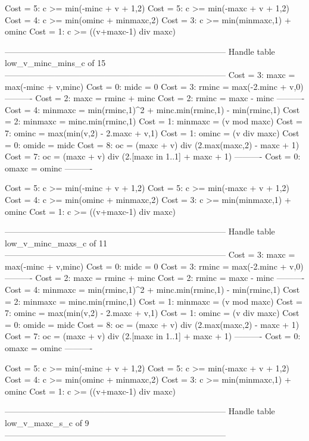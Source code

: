 Cost =  5:  c >= min(-minc + v + 1,2)
Cost =  5:  c >= min(-maxc + v + 1,2)
Cost =  4:  c >= min(ominc + minmaxc,2)
Cost =  3:  c >= min(minmaxc,1) + ominc
Cost =  1:  c >= ((v+maxc-1) div maxc)

--------------------------------------------------------------------------------
Handle table low_v_minc_mins_c of 15
--------------------------------------------------------------------------------
Cost =  3:  maxc    = max(-minc + v,minc)
Cost =  0:  midc    = 0
Cost =  3:  rminc   = max(-2.minc + v,0)
----------
Cost =  2:  maxc    = rminc + minc
Cost =  2:  rminc   = maxc - minc
----------
Cost =  4:  minmaxc = min(rminc,1)^2 + minc.min(rminc,1) - min(rminc,1)
Cost =  2:  minmaxc = minc.min(rminc,1)
Cost =  1:  minmaxc = (v mod maxc)
Cost =  7:  ominc   = max(min(v,2) - 2.maxc + v,1)
Cost =  1:  ominc   = (v div maxc)
Cost =  0:  omidc   = midc
Cost =  8:  oc      = (maxc + v) div (2.max(maxc,2) - maxc + 1)
Cost =  7:  oc      = (maxc + v) div (2.[maxc in 1..1] + maxc + 1)
----------
Cost =  0:  omaxc   = ominc
----------

Cost =  5:  c >= min(-minc + v + 1,2)
Cost =  5:  c >= min(-maxc + v + 1,2)
Cost =  4:  c >= min(ominc + minmaxc,2)
Cost =  3:  c >= min(minmaxc,1) + ominc
Cost =  1:  c >= ((v+maxc-1) div maxc)

--------------------------------------------------------------------------------
Handle table low_v_minc_maxs_c of 11
--------------------------------------------------------------------------------
Cost =  3:  maxc    = max(-minc + v,minc)
Cost =  0:  midc    = 0
Cost =  3:  rminc   = max(-2.minc + v,0)
----------
Cost =  2:  maxc    = rminc + minc
Cost =  2:  rminc   = maxc - minc
----------
Cost =  4:  minmaxc = min(rminc,1)^2 + minc.min(rminc,1) - min(rminc,1)
Cost =  2:  minmaxc = minc.min(rminc,1)
Cost =  1:  minmaxc = (v mod maxc)
Cost =  7:  ominc   = max(min(v,2) - 2.maxc + v,1)
Cost =  1:  ominc   = (v div maxc)
Cost =  0:  omidc   = midc
Cost =  8:  oc      = (maxc + v) div (2.max(maxc,2) - maxc + 1)
Cost =  7:  oc      = (maxc + v) div (2.[maxc in 1..1] + maxc + 1)
----------
Cost =  0:  omaxc   = ominc
----------

Cost =  5:  c >= min(-minc + v + 1,2)
Cost =  5:  c >= min(-maxc + v + 1,2)
Cost =  4:  c >= min(ominc + minmaxc,2)
Cost =  3:  c >= min(minmaxc,1) + ominc
Cost =  1:  c >= ((v+maxc-1) div maxc)

--------------------------------------------------------------------------------
Handle table low_v_maxc_s_c of 9
--------------------------------------------------------------------------------

